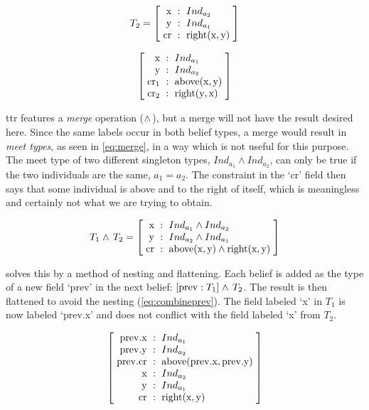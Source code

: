 \begin{equation} \label{eq:combineterm2}
T_2 = \rec{
    \text{x} &:& Ind_{a_2} \\
    \text{y} &:& Ind_{a_1} \\
    \text{cr} &:& \text{right}(\text{x}, \text{y})
    }
\end{equation}

\begin{equation} \label{eq:combination}
\rec{
    \text{x} &:& Ind_{a_1} \\
    \text{y} &:& Ind_{a_2} \\
    \text{cr}_1 &:& \text{above}(\text{x}, \text{y}) \\
    \text{cr}_2 &:& \text{right}(\text{y}, \text{x})
    }
\end{equation}

\gls{ttr} features a \textit{merge} operation ($\mathrel{\wedge_{\mkern-10mu\cdot\mkern6mu}}$), but a merge will not have the result desired here.
Since the same labels occur in both belief types, a merge would result in \textit{meet types}, as seen in \autoref{eq:merge}, in a way which is not useful for this purpose.
The meet type of two different singleton types, $Ind_{a_1} \wedge Ind_{a_2}$, can only be true if the two individuals are the same, $a_1 = a_2$.
The constraint in the `cr' field then says that some individual is above and to the right of itself, which is meaningless and certainly not what we are trying to obtain.

\begin{equation} \label{eq:merge}
T_1  \ttrmerge T_2 =
\rec{
    \text{x} &:& Ind_{a_1} \wedge Ind_{a_2} \\
    \text{y} &:& Ind_{a_2} \wedge Ind_{a_1} \\
    \text{cr} &:& \text{above}(\text{x}, \text{y}) \wedge \text{right}(\text{x}, \text{y})
    }
\end{equation}

\cite{CooperTypetheorylanguage2016} solves this by a method of nesting and flattening.
Each belief is added as the type of a new field `prev' in the next belief: $[\text{prev} : T_1] \mathrel{\wedge_{\mkern-10mu\cdot\mkern6mu}} T_2$.
The result is then flattened to avoid the nesting (\autoref{eq:combineprev}).
The field labeled `x' in $T_1$ is now labeled `prev.x' and does not conflict with the field labeled `x' from $T_2$.

\begin{equation} \label{eq:combineprev}
\rec{
    \text{prev.x} &:& Ind_{a_1} \\
    \text{prev.y} &:& Ind_{a_2} \\
    \text{prev.cr} &:& \text{above}(\text{prev.x}, \text{prev.y}) \\
    \text{x} &:& Ind_{a_2} \\
    \text{y} &:& Ind_{a_1} \\
    \text{cr} &:& \text{right}(\text{x}, \text{y})
    }
\end{equation}

